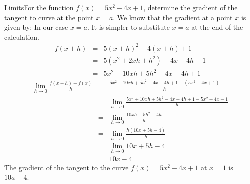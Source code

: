 \begin{wex}
{Limits}{For the function $f(x)=5x^2-4x+1$, determine the gradient of the tangent to curve at the point $x=a$.}{
We know that the gradient at a point $x$ is given by:
In our case $x=a$. It is simpler to substitute $x=a$ at the end of the calculation.
\begin{eqnarray*}
f(x+h)&=&5(x+h)^2-4(x+h)+1\\
&=&5(x^2+2xh+h^2)-4x-4h+1\\
&=&5x^2+10xh+5h^2-4x-4h+1
\end{eqnarray*}
\begin{eqnarray*}
\lim_{h \to 0}\frac{f(x+h)-f(x)}{h}&=&\frac{5x^2+10xh+5h^2-4x-4h+1 - (5x^2-4x+1)}{h}\\
&=&\lim_{h \to 0}\frac{5x^2+10xh+5h^2-4x-4h+1 - 5x^2+4x-1}{h}\\
&=&\lim_{h \to 0}\frac{10xh+5h^2-4h}{h}\\
&=&\lim_{h \to 0}\frac{h(10x+5h-4)}{h}\\
&=&\lim_{h \to 0}10x+5h-4\\
&=&10x-4
\end{eqnarray*}
The gradient of the tangent to the curve $f(x)=5x^2-4x+1$ at $x=1$ is $10a-4$.
}
\end{wex}



